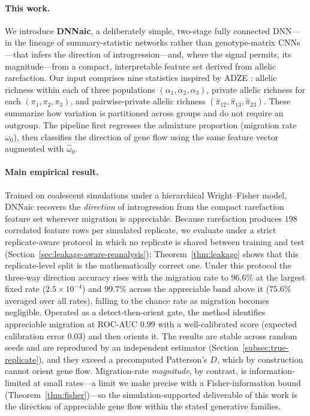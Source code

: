 \documentclass[11pt]{article}
\theoremstyle{plain}
\theoremstyle{definition}
\theoremstyle{remark}
\begin{document}
\paragraph{This work.} We introduce \textbf{DNNaic}, a deliberately simple, two-stage fully connected DNN---in the lineage of summary-statistic networks \citep{sheehan2016deep} rather than genotype-matrix CNNs---that infers the direction of introgression---and, where the signal permits, its magnitude---from a compact, interpretable feature set derived from allelic rarefaction. Our input comprises nine statistics inspired by ADZE \citep{szpiech2008adze}: allelic richness within each of three populations $(\alpha_1,\alpha_2,\alpha_3)$, private allelic richness for each $(\pi_1,\pi_2,\pi_3)$, and pairwise-private allelic richness $(\hat{\pi}_{12},\hat{\pi}_{13},\hat{\pi}_{23})$. These summarize how variation is partitioned across groups and do not require an outgroup. The pipeline first regresses the admixture proportion (migration rate $\omega_0$), then classifies the direction of gene flow using the same feature vector augmented with $\widehat{\omega}_0$.

\paragraph{Main empirical result.} Trained on coalescent simulations under a hierarchical
Wright--Fisher model, DNNaic recovers the \emph{direction} of introgression from the compact
rarefaction feature set wherever migration is appreciable. Because rarefaction produces $198$
correlated feature rows per simulated replicate, we evaluate under a strict replicate-aware protocol
in which no replicate is shared between training and test (Section~\ref{sec:leakage-aware-reanalysis});
Theorem~\ref{thm:leakage} shows that this replicate-level split is the mathematically correct one.
Under this protocol the three-way direction accuracy rises with the migration rate to $96.6\%$ at
the largest fixed rate ($2.5\times10^{-4}$) and $99.7\%$ across the appreciable band above it
($75.6\%$ averaged over all rates), falling to the chance rate as migration becomes negligible.
Operated as a detect-then-orient gate, the method identifies appreciable migration at ROC-AUC $0.99$
with a well-calibrated score (expected calibration error $0.03$) and then orients it. The results are
stable across random seeds and are reproduced by an independent estimator
(Section~\ref{subsec:true-replicate}), and they exceed a precomputed Patterson's $D$, which by
construction cannot orient gene flow. Migration-rate \emph{magnitude}, by contrast, is information-limited at small
rates---a limit we make precise with a Fisher-information bound (Theorem~\ref{thm:fisher})---so the
simulation-supported deliverable of this work is the direction of appreciable gene flow within the
stated generative families.
\end{document}
